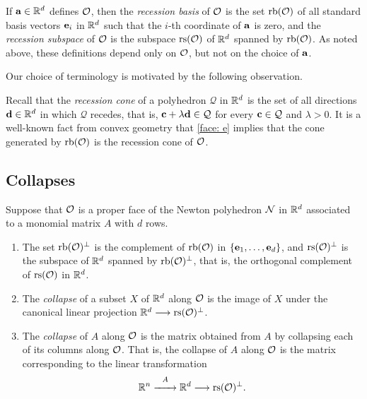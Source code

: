 \documentclass[11pt]{amsart}
\begin{document}
\begin{definition}
   If $\mathbf{a} \in \mathbb{R}^d$ defines $\mathcal{O}$, then the \emph{recession basis} of $\mathcal{O}$ is the set $\operatorname{rb}(\mathcal{O})$ of all standard basis vectors $\mathbf{e}_i$ in $\mathbb{R}^d$ such that the $i$-th coordinate of $\mathbf{a}$ is zero, and the \emph{recession subspace} of $\mathcal{O}$ is the subspace $\operatorname{rs}(\mathcal{O})$ of $\mathbb{R}^d$ spanned by $\operatorname{rb}(\mathcal{O})$.  
   As noted above, these definitions depend only on $\mathcal{O}$, but not on the choice of $\mathbf{a}$.
\end{definition}

Our choice of terminology is motivated by the following observation.

\begin{remark}  Recall that the \emph{recession cone} of a polyhedron $\mathcal{Q}$ in $\mathbb{R}^d$ is the set of all directions $\mathbf{d} \in \mathbb{R}^d$ in which $\mathcal{Q}$ recedes, that is, $\mathbf{c} + \lambda \mathbf{d} \in \mathcal{Q}$ for every $\mathbf{c} \in \mathcal{Q}$ and $\lambda > 0$.  It is a well-known fact from convex geometry that  \eqref{face: e} implies that the cone generated by $\operatorname{rb}(\mathcal{O})$ is the recession cone of $\mathcal{O}$.
\end{remark}

\subsection{Collapses} 

\begin{definition}  
\label{collapse: D}
 Suppose that $\mathcal{O}$ is a proper face of the Newton polyhedron $\mathcal{N}$ in $\mathbb{R}^d$ associated to a monomial matrix $A$ with $d$ rows.  

\begin{enumerate}
\item The set $\operatorname{rb}(\mathcal{O})^{\perp}$ is the complement of $\operatorname{rb}(\mathcal{O})$ in $\{ \mathbf{e}_1, \ldots, \mathbf{e}_d \}$, and $\operatorname{rs}(\mathcal{O})^\perp$ is the subspace of $\mathbb{R}^d$ spanned by $\operatorname{rb}(\mathcal{O})^\perp$, that is, the orthogonal complement of $\operatorname{rs}(\mathcal{O})$ in $\mathbb{R}^d$.
\item The \emph{collapse} of a subset $X$ of $\mathbb{R}^d$ along $\mathcal{O}$ is the image of $X$ under the canonical linear projection $\mathbb{R}^d \longrightarrow \operatorname{rs}(\mathcal{O})^{\perp}$.
\item The \emph{collapse} of $A$ along $\mathcal{O}$ is the matrix obtained from $A$ by collapsing each of its columns along $\mathcal{O}$.  That is, the collapse of $A$ along $\mathcal{O}$ is the matrix corresponding to the linear transformation  
%
\[ \mathbb{R}^n \stackrel{A}{\xrightarrow{\hspace*{6mm}}} \mathbb{R}^d \longrightarrow \operatorname{rs}(\mathcal{O})^{\perp}.\]  
%
\end{enumerate}
\end{definition}     
\end{document}
